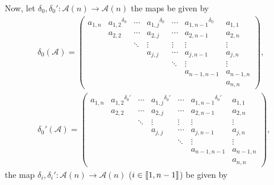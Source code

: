 \documentclass[pdftex]{sigma}
\numberwithin{equation}{section}
\def\d{\delta}
\def\A{\mathscr{A}}
\def\lbb#1{\left[\kern-0.15em\left[ {#1} \right] \kern-0.15em\right]}
\begin{document}
Now, let $\d_0, \d_0'\colon \A(n) \rightarrow \A(n)$ the maps be given by
\begin{gather*}%
\d_0(\A)=
 \begin{pmatrix}
 a_{1,n} &{a_{1,2}}^{\d_0} & \cdots & {a_{1,j}}^{\d_0}& \cdots &{a_{1,n-1}}^{\d_0}& a_{1,1} \\[1pt]
 & a_{2,2} & \cdots & a_{2,j} & \cdots &a_{2,n-1} &a_{2,n}\\[1pt]
 & & \ddots & \vdots & \vdots & \vdots & \vdots \\[1pt]
 & & & a_{j,j} & \cdots &a_{j,n-1} &a_{j,n}\\[1pt]
 & & & & \ddots & \vdots & \vdots \\[1pt]
 & & & & & a_{n-1,n-1}& a_{n-1,n}\\[1pt]
 & & & & & & a_{n,n}
 \end{pmatrix}
, \\
\d_0'(\A)=
 \begin{pmatrix}
 a_{1,n} & {a_{1,2}}^{\d_0'} & \cdots & {a_{1,j}}^{\d_0'}& \cdots &{a_{1,n-1}}^{\d_0'} & a_{1,1} \\[1pt]
 & a_{2,2} & \cdots & a_{2,j} & \cdots &a_{2,n-1} &a_{2,n}\\[1pt]
 & & \ddots & \vdots & \vdots & \vdots & \vdots \\[1pt]
 & & & a_{j,j} & \cdots &a_{j,n-1} &a_{j,n}\\[1pt]
 & & & & \ddots & \vdots & \vdots \\[1pt]
 & & & & & a_{n-1,n-1}& a_{n-1,n}\\[1pt]
 & & & & & & a_{n,n}
 \end{pmatrix},
\end{gather*}
the map $\d_i, \d_i'\colon \A(n) \rightarrow \A(n)$ ($i \in \lbb{1,n-1}$) be given by
\end{document}

